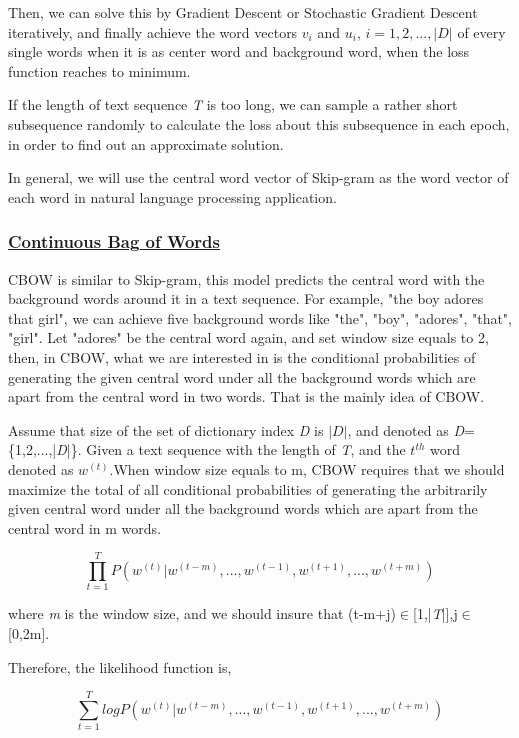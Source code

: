 \documentclass[10pt, conference, compsocconf]{IEEEtran}
\begin{document}
Then, we can solve this by Gradient Descent or Stochastic Gradient Descent iteratively, and finally achieve the word vectors $v_{i}$ and $u_{i}$, \(i=1,2,...,\big|D\big|\) of every single words when it is as center word and background word, when the loss function reaches to minimum.

If the length of text sequence \textit{T} is too long, we can sample a rather short subsequence randomly to calculate the loss about this subsequence in each epoch, in order to find out an approximate solution.

In general, we will use the central word vector of Skip-gram as the word vector of each word in natural language processing application.

\subsubsection{\underline{Continuous Bag of Words}}

CBOW is similar to Skip-gram, this model predicts the central word with the background words around it in a text sequence. For example, "the boy adores that girl", we can achieve five background words like "the", "boy", "adores", "that", "girl". Let "adores" be the central word again, and set window size equals to 2, then, in CBOW, what we are interested in is the conditional probabilities of generating the given central word under all the background words which are apart from the central word in two words. That is the mainly idea of CBOW.

Assume that size of the set of dictionary index \textit{D} is $\big|\textit{D}\big|$, and denoted as \textit{D}=\{1,2,...,\big|\textit{D}\big|\}. Given a text sequence with the length of \textit{T}, and the $t^{th}$ word denoted as $w^{(t)}$.When window size equals to m, CBOW requires that we should maximize the total of all conditional probabilities of generating the arbitrarily given central word under all the background words which are apart from the central word in m words.

\begin{equation}
\prod_{t=1}^{T}P(w^{(t)}\big|w^{(t-m)},...,w^{(t-1)},w^{(t+1)},...,w^{(t+m)})
\end{equation}

where \textit{m} is the window size, and we should insure that (t-m+j)$\in$[1,\big|\textit{T}\big|],j$\in$[0,2m].

Therefore, the likelihood function is,

\begin{equation}
\sum_{t=1}^{T}logP(w^{(t)}\big|w^{(t-m)},...,w^{(t-1)},w^{(t+1)},...,w^{(t+m)})
\end{equation}
\end{document}
